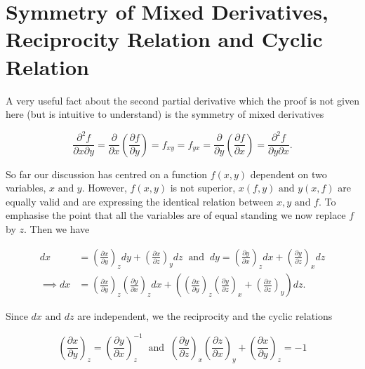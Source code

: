 \documentclass[english,a4paper,12pt]{report}
\begin{document}
\section{Symmetry of Mixed Derivatives, Reciprocity Relation and Cyclic Relation}

A very useful fact about the second partial derivative which the proof is not given here (but is intuitive to understand) is the symmetry of mixed derivatives

\begin{equation}
    \frac{\partial^2 f}{\partial x \partial y} = \frac{\partial }{\partial x} \left( \frac{\partial f}{\partial y}  \right) = f_{xy} = f_{yx} = \frac{\partial }{\partial y} \left( \frac{\partial f}{\partial x}  \right) = \frac{\partial^2 f}{\partial y \partial x}.     
\end{equation}

So far our discussion has centred on a function \(f(x,y)\) dependent on two variables, \(x\text { and } y\). However, \(f(x,y)\) is not superior, \(x(f,y) \text { and } y(x,f)\) are equally valid and are expressing the identical relation between \(x,y \text { and } f\). To emphasise the point that all the variables are of equal standing we now replace \(f\) by \(z\). Then we have

\begin{equation}
    \begin{aligned}
    dx &= \left( \frac{\partial x}{\partial y}  \right)_{z} dy + \left( \frac{\partial x}{\partial z}  \right)_{y} dz ~\text { and }~   dy = \left( \frac{\partial y}{\partial x}  \right)_{z} dx + \left( \frac{\partial y}{\partial z}  \right)_{x} dz \\
    \implies dx &= \left( \frac{\partial x}{\partial y}  \right)_{z} \left( \frac{\partial y}{\partial x}  \right)_{z} dx + \left( \left( \frac{\partial x}{\partial y}  \right)_{z}  \left( \frac{\partial y}{\partial z}  \right)_{x} + \left( \frac{\partial x}{\partial z}  \right)_{y}  \right) dz. 
    \end{aligned}
\end{equation}

Since \(dx \text { and }  dz\) are independent, we the reciprocity and the cyclic relations

\begin{equation}
    \left( \frac{\partial x}{\partial y}  \right)_{z} = \left( \frac{\partial y}{\partial x}  \right)_{z}^{-1} ~\text { and }~ \left( \frac{\partial y}{\partial z}  \right)_{x} \left( \frac{\partial z}{\partial x}  \right)_{y} + \left( \frac{\partial x}{\partial y}  \right)_{z} = -1 
\end{equation}
\end{document}
